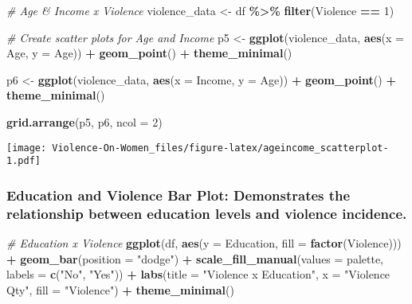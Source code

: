 \documentclass[
]{article}
\newenvironment{Shaded}{\begin{snugshade}}{\end{snugshade}}
\newcommand{\AttributeTok}[1]{\textcolor[rgb]{0.13,0.29,0.53}{#1}}
\newcommand{\CommentTok}[1]{\textcolor[rgb]{0.56,0.35,0.01}{\textit{#1}}}
\newcommand{\DecValTok}[1]{\textcolor[rgb]{0.00,0.00,0.81}{#1}}
\newcommand{\FunctionTok}[1]{\textcolor[rgb]{0.13,0.29,0.53}{\textbf{#1}}}
\newcommand{\NormalTok}[1]{#1}
\newcommand{\OtherTok}[1]{\textcolor[rgb]{0.56,0.35,0.01}{#1}}
\newcommand{\SpecialCharTok}[1]{\textcolor[rgb]{0.81,0.36,0.00}{\textbf{#1}}}
\newcommand{\StringTok}[1]{\textcolor[rgb]{0.31,0.60,0.02}{#1}}
\begin{document}
\begin{Shaded}
\begin{Highlighting}[]
\CommentTok{\# Age \& Income x Violence}
\NormalTok{violence\_data }\OtherTok{\textless{}{-}}\NormalTok{ df }\SpecialCharTok{\%\textgreater{}\%} \FunctionTok{filter}\NormalTok{(Violence }\SpecialCharTok{==} \DecValTok{1}\NormalTok{)}

\CommentTok{\# Create scatter plots for Age and Income}
\NormalTok{p5 }\OtherTok{\textless{}{-}} \FunctionTok{ggplot}\NormalTok{(violence\_data, }\FunctionTok{aes}\NormalTok{(}\AttributeTok{x =}\NormalTok{ Age, }\AttributeTok{y =}\NormalTok{ Age)) }\SpecialCharTok{+}
  \FunctionTok{geom\_point}\NormalTok{() }\SpecialCharTok{+}
  \FunctionTok{theme\_minimal}\NormalTok{()}

\NormalTok{p6 }\OtherTok{\textless{}{-}} \FunctionTok{ggplot}\NormalTok{(violence\_data, }\FunctionTok{aes}\NormalTok{(}\AttributeTok{x =}\NormalTok{ Income, }\AttributeTok{y =}\NormalTok{ Age)) }\SpecialCharTok{+}
  \FunctionTok{geom\_point}\NormalTok{() }\SpecialCharTok{+}
  \FunctionTok{theme\_minimal}\NormalTok{()}

\FunctionTok{grid.arrange}\NormalTok{(p5, p6, }\AttributeTok{ncol =} \DecValTok{2}\NormalTok{)}
\end{Highlighting}
\end{Shaded}

\texttt{[image: Violence-On-Women\_files/figure-latex/ageincome\_scatterplot-1.pdf]}

\hypertarget{education-and-violence-bar-plot-demonstrates-the-relationship-between-education-levels-and-violence-incidence.}{%
\subsubsection{Education and Violence Bar Plot: Demonstrates the
relationship between education levels and violence
incidence.}\label{education-and-violence-bar-plot-demonstrates-the-relationship-between-education-levels-and-violence-incidence.}}

\begin{Shaded}
\begin{Highlighting}[]
\CommentTok{\# Education x Violence}
\FunctionTok{ggplot}\NormalTok{(df, }\FunctionTok{aes}\NormalTok{(}\AttributeTok{y =}\NormalTok{ Education, }\AttributeTok{fill =} \FunctionTok{factor}\NormalTok{(Violence))) }\SpecialCharTok{+}
  \FunctionTok{geom\_bar}\NormalTok{(}\AttributeTok{position =} \StringTok{"dodge"}\NormalTok{) }\SpecialCharTok{+}
  \FunctionTok{scale\_fill\_manual}\NormalTok{(}\AttributeTok{values =}\NormalTok{ palette, }\AttributeTok{labels =} \FunctionTok{c}\NormalTok{(}\StringTok{"No"}\NormalTok{, }\StringTok{"Yes"}\NormalTok{)) }\SpecialCharTok{+}
  \FunctionTok{labs}\NormalTok{(}\AttributeTok{title =} \StringTok{"Violence x Education"}\NormalTok{, }\AttributeTok{x =} \StringTok{"Violence Qty"}\NormalTok{, }\AttributeTok{fill =} \StringTok{"Violence"}\NormalTok{) }\SpecialCharTok{+}
  \FunctionTok{theme\_minimal}\NormalTok{()}
\end{Highlighting}
\end{Shaded}
\end{document}
